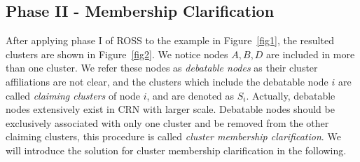 \documentclass[10pt,journal,compsoc]{IEEEtran}
\makeatletter
\theoremstyle{mytheoremstyle}
\theoremstyle{mytheoremstyle}
\theoremstyle{mytheoremstyle}
\renewenvironment{proof}[1][\proofname]{%
      \par\pushQED{\qed}\fontfamily{ptm}\selectfont%
      \topsep6\p@\@plus6\p@\relax
      \trivlist\item[\hskip\labelsep\bfseries#1\@addpunct{.}]%
      \ignorespaces
    }{%
      \popQED\endtrivlist\@endpefalse
    }
\makeatother
\begin{document}
\subsection{Phase II - Membership Clarification}
After applying phase I of ROSS to the example in Figure~\ref{fig1}, the resulted clusters are shown in Figure~\ref{fig2}.
We notice nodes $A, B, D$ are included in more than one cluster. 
We refer these nodes as \textit{debatable nodes} as their cluster affiliations are not clear, and the clusters which include the debatable node $i$ are called \textit{claiming clusters} of node $i$, and are denoted as $S_i$.  
Actually, debatable nodes extensively exist in CRN with larger scale.
Debatable nodes should be exclusively associated with only one cluster and be removed from the other claiming clusters, this procedure is called \textit{cluster membership clarification}.
We will introduce the solution for cluster membership clarification in the following.	







%

\end{document}
